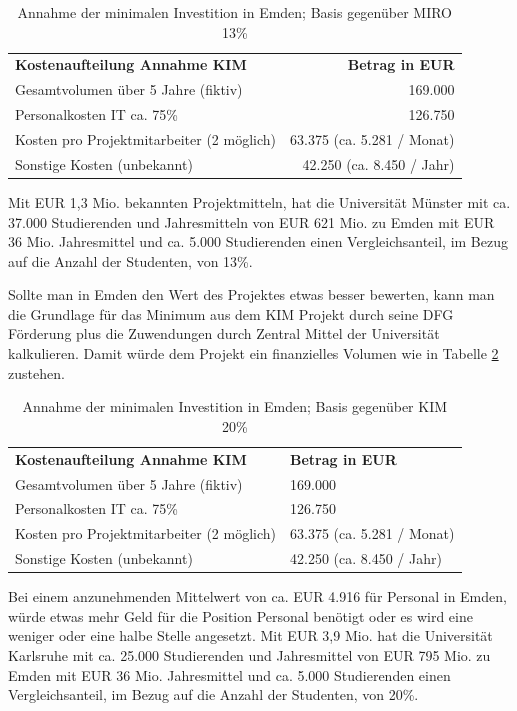 \begin{table}[h!]
	\begin{tabularx}{\textwidth}{l|r}
		\hline
		\textbf{Kostenaufteilung Annahme KIM} & \textbf{Betrag in EUR}\\
		Gesamtvolumen über 5 Jahre (fiktiv) & 169.000\\
		Personalkosten IT ca. 75\% & 126.750\\
		Kosten pro Projektmitarbeiter (2 möglich) & 63.375 (ca. 5.281 / Monat)\\ 
		Sonstige Kosten (unbekannt) & 42.250 (ca. 8.450 / Jahr)\\
		\hline
	\end{tabularx}
	\caption{Annahme der minimalen Investition in Emden; Basis gegenüber MIRO 13\%}
	\label{tab_kostenaufteilung_emden_MIRO}
\end{table}

Mit EUR 1,3 Mio. bekannten Projektmitteln, hat die Universität Münster mit ca. 37.000 Studierenden und Jahresmitteln von EUR 621 Mio. zu Emden mit EUR 36 Mio. Jahresmittel und ca. 5.000 Studierenden einen Vergleichsanteil, im Bezug auf die Anzahl der Studenten, von 13\%.

Sollte man in Emden den Wert des Projektes etwas besser bewerten, kann man die Grundlage für das Minimum aus dem KIM Projekt durch seine DFG Förderung plus die Zuwendungen durch Zentral Mittel der Universität kalkulieren. Damit würde dem Projekt ein finanzielles Volumen wie in Tabelle \ref{tab_kostenaufteilung_emden_KIM} zustehen.

\begin{table}[h!]
	\begin{tabularx}{\textwidth}{l|X}
		\hline
		\textbf{Kostenaufteilung Annahme KIM} & \textbf{Betrag in EUR}\\
		Gesamtvolumen über 5 Jahre (fiktiv) & 169.000\\
		Personalkosten IT ca. 75\% & 126.750\\
		Kosten pro Projektmitarbeiter (2 möglich) & 63.375 (ca. 5.281 / Monat)\\ 
		Sonstige Kosten (unbekannt) & 42.250 (ca. 8.450 / Jahr)\\
		\hline
	\end{tabularx}
	\caption{Annahme der minimalen Investition in Emden; Basis gegenüber KIM 20\%}
	\label{tab_kostenaufteilung_emden_KIM}
\end{table}

Bei einem anzunehmenden Mittelwert von ca. EUR 4.916 für Personal in Emden, würde etwas mehr Geld für die Position Personal benötigt oder es wird eine weniger oder eine halbe Stelle angesetzt. Mit EUR 3,9 Mio. hat die Universität Karlsruhe mit ca. 25.000 Studierenden und Jahresmittel von EUR 795 Mio.  zu Emden mit EUR 36 Mio. Jahresmittel und ca. 5.000 Studierenden einen Vergleichsanteil, im Bezug auf die Anzahl der Studenten, von 20\%.